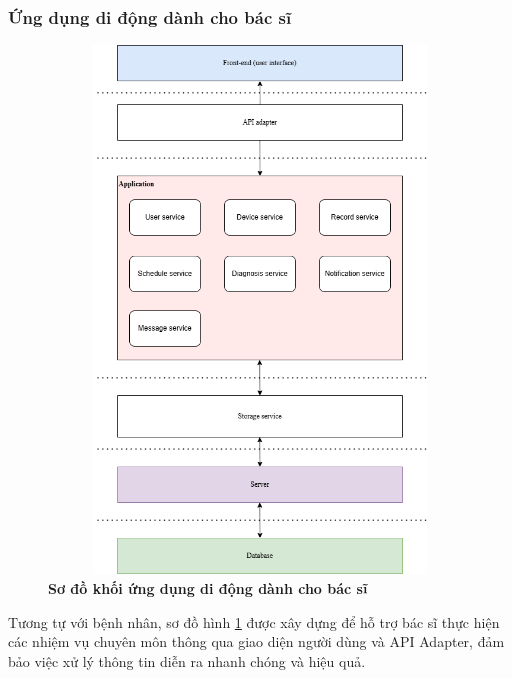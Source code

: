 \subsubsection{Ứng dụng di động dành cho bác sĩ}
\begin{figure}[H]
  \centering
  \includegraphics[width=12cm,height=14cm]{Images/System/fmECG_architecture-Doctors.drawio.png}
  \caption[Sơ đồ khối Ứng dụng dành cho bác sĩ]{\bfseries \fontsize{12pt}{0pt}\selectfont Sơ đồ khối ứng dụng di động dành cho bác sĩ}
  \label{fmECG_architecture-Doctor} %
\end{figure}
Tương tự với bệnh nhân, sơ đồ hình \ref{fmECG_architecture-Doctor} được xây dựng để hỗ trợ bác sĩ thực hiện các nhiệm vụ chuyên môn thông qua giao diện người dùng và API Adapter, đảm bảo việc xử lý thông tin diễn ra nhanh chóng và hiệu quả.

